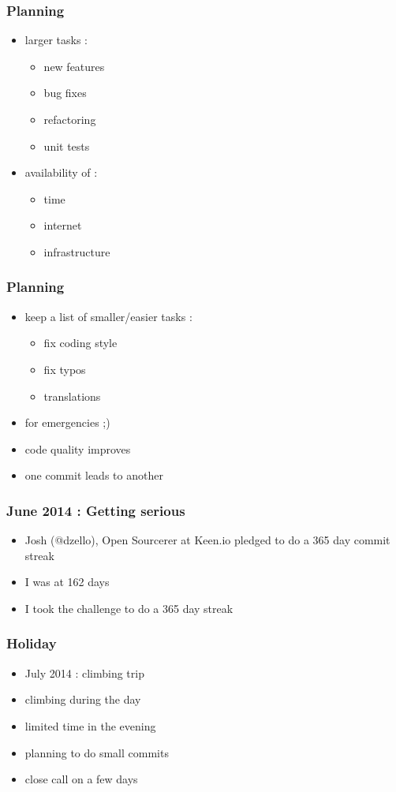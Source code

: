 \documentclass[14pt]{beamer}
\begin{document}
  \begin{frame}
    \frametitle{Planning}
    \begin{itemize}
      \item larger tasks :
      \begin{itemize}
        \item new features
        \item bug fixes
        \item refactoring
        \item unit tests
      \end{itemize}
      \item availability of :
      \begin{itemize}
        \item time
        \item internet
        \item infrastructure
      \end{itemize}
    \end{itemize}
  \end{frame}
  \begin{frame}
    \frametitle{Planning}
    \begin{itemize}
      \item keep a list of smaller/easier tasks :
      \begin{itemize}
        \item fix coding style
        \item fix typos
        \item translations
      \end{itemize}
      \item for emergencies ;)
      \item code quality improves
      \item one commit leads to another
    \end{itemize}
  \end{frame}
  \begin{frame}
    \frametitle{June 2014 : Getting serious}
    \begin{itemize}
      \item Josh (@dzello), Open Sourcerer at Keen.io pledged to do a 365 day commit streak
      \item I was at 162 days
      \item I took the challenge to do a 365 day streak
    \end{itemize}
  \end{frame}
  \begin{frame}
    \frametitle{Holiday}
    \begin{itemize}
      \item July 2014 : climbing trip
      \item climbing during the day
      \item limited time in the evening
      \item planning to do small commits
      \item close call on a few days
    \end{itemize}
  \end{frame}
\end{document}
